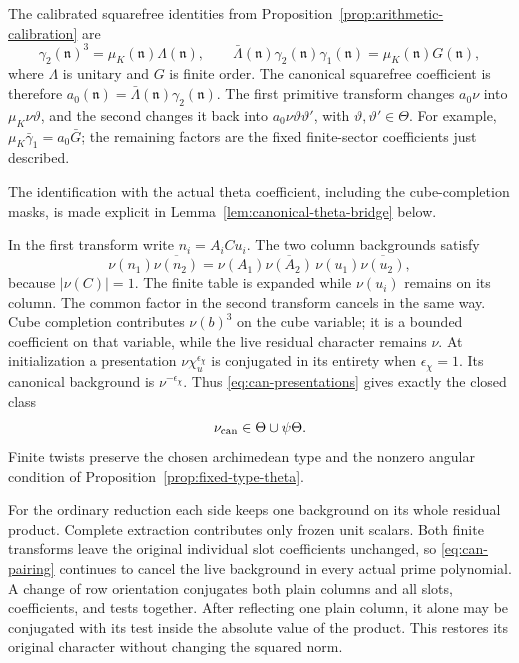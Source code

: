 \documentclass[11pt,a4paper]{article}
\numberwithin{equation}{section}
\theoremstyle{definition}
\theoremstyle{remark}
\begin{document}
The calibrated squarefree identities from
Proposition~\ref{prop:arithmetic-calibration} are
\begin{equation}\label{eq:can-calibration}
 \gamma_2(\mathfrak n)^3=\mu_K(\mathfrak n)\Lambda(\mathfrak n),
 \qquad
 \bar\Lambda(\mathfrak n)\gamma_2(\mathfrak n)\gamma_1(\mathfrak n)
     =\mu_K(\mathfrak n)G(\mathfrak n),
\end{equation}
where $\Lambda$ is unitary and $G$ is finite order.
The canonical squarefree coefficient is therefore
$a_0(\mathfrak n)=\bar\Lambda(\mathfrak n)\gamma_2(\mathfrak n)$.
The first primitive transform changes $a_0\nu$ into
$\mu_K\nu\vartheta$, and the second changes it back into
$a_0\nu\vartheta\vartheta'$, with $\vartheta,\vartheta'\in\Theta$.
For example, $\mu_K\bar\gamma_1=a_0\bar G$; the remaining factors are
the fixed finite-sector coefficients just described.

The identification with the actual theta coefficient, including the
cube-completion masks, is made explicit in
Lemma~\ref{lem:canonical-theta-bridge} below.

In the first transform write $n_i=A_iCu_i$.  The two column backgrounds
satisfy
\[
 \nu(n_1)\overline{\nu(n_2)}
   =\nu(A_1)\overline{\nu(A_2)}\,
       \nu(u_1)\overline{\nu(u_2)},
\]
because $|\nu(C)|=1$.  The finite table is expanded while
$\nu(u_i)$ remains on its column.  The common factor in the second
transform cancels in the same way.  Cube completion contributes
$\nu(b)^3$ on the cube variable; it is a bounded coefficient on that variable, while the live residual
character remains $\nu$.
At initialization a presentation $\nu\chi_u^{\epsilon_\chi}$ is
conjugated in its entirety when $\epsilon_\chi=1$.  Its canonical
background is $\nu^{-\epsilon_\chi}$.  Thus
\eqref{eq:can-presentations} gives exactly the closed class
\begin{equation}\label{eq:can-background-class}
 \nu_{\rm can}\in\Theta\cup\psi\Theta.
\end{equation}
Finite twists preserve the chosen archimedean type and the nonzero
angular condition of Proposition~\ref{prop:fixed-type-theta}.

For the ordinary reduction each side keeps one background on its
whole residual product.  Complete extraction contributes only
frozen unit scalars.  Both finite transforms leave the original
individual slot coefficients unchanged, so
\eqref{eq:can-pairing} continues to cancel the live background in every
actual prime polynomial.  A change of row orientation conjugates both
plain columns and all slots, coefficients, and tests together.
After reflecting one plain column, it alone may be conjugated with
its test inside the absolute value of the product.  This restores its
original character without changing the squared norm.
\end{document}
